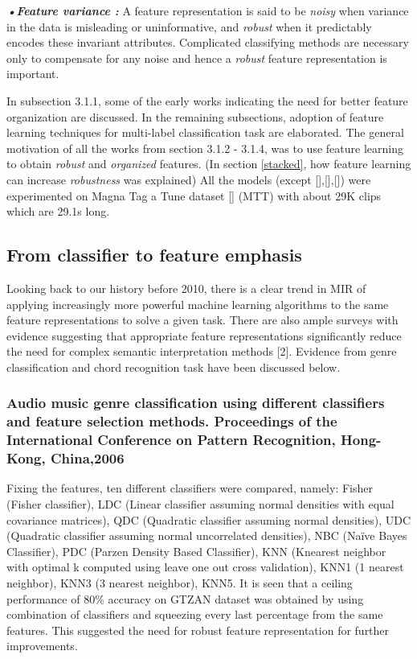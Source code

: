 \noindent \textit{\textbf{•Feature variance :}} A feature representation is said to be \textit{noisy} when variance in the data is misleading or uninformative, and \textit{robust} when it predictably encodes these invariant attributes. Complicated classifying methods are necessary only to compensate for any noise and hence a \textit{robust} feature representation is important.
\bigskip

\noindent In subsection 3.1.1, some of the early works indicating the need for better feature organization are discussed. In the remaining subsections, adoption of feature learning techniques for multi-label classification task are elaborated. The general motivation of all the works from section 3.1.2 - 3.1.4, was to use feature learning to obtain \textit{robust} and \textit{organized} features. (In section \ref{stacked}, how feature learning can increase \textit{robustness} was explained) All the models (except [],[],[]) were experimented on Magna Tag a Tune dataset [] (MTT) with about 29K clips which are 29.1s long.


\subsection{From classifier to feature emphasis}
Looking back to our history before 2010, there is a clear trend in MIR of applying increasingly more powerful machine learning algorithms to the same feature representations to solve a given task. There are also ample surveys with evidence suggesting that appropriate feature representations significantly reduce the need for complex semantic interpretation methods [2]. Evidence from genre classification and chord recognition task have been discussed below. 

\subsubsection{Audio music genre classification using different classifiers and feature selection methods. Proceedings of the International Conference on Pattern Recognition, Hong-Kong, China,2006}
Fixing the features, ten different classifiers were compared, namely: Fisher (Fisher classifier), LDC (Linear classifier assuming normal densities with equal covariance matrices), QDC (Quadratic classifier assuming normal densities), UDC (Quadratic classifier assuming normal uncorrelated densities), NBC (Naïve Bayes Classifier), PDC (Parzen Density Based Classifier), KNN (Knearest neighbor with optimal k computed using leave one out cross validation), KNN1 (1 nearest neighbor), KNN3 (3 nearest neighbor), KNN5.  It is seen that a ceiling performance of 80\% accuracy on GTZAN dataset was obtained by using combination of classifiers and squeezing every last percentage from the same features. This suggested the need for robust feature representation for further improvements.

